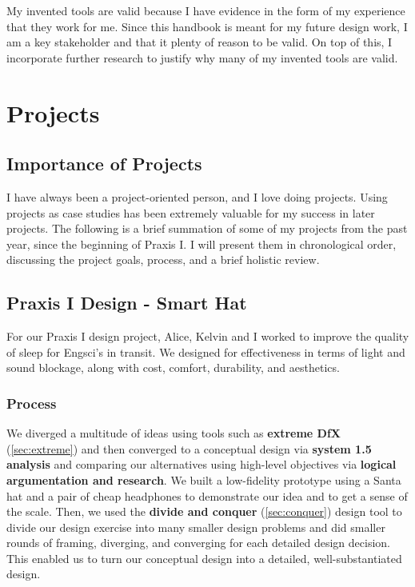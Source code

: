 \documentclass[a4paper,12pt]{article}
\begin{document}
My invented tools are valid because I have evidence in the form of my experience that they work for me. Since this handbook is meant for my future design work, I am a key stakeholder and that it plenty of reason to be valid. On top of this, I incorporate further research to justify why many of my invented tools are valid.




\section{Projects}
\subsection{Importance of Projects}
I have always been a project-oriented person, and I love doing projects. Using projects as case studies has been extremely valuable for my success in later projects. The following is a brief summation of some of my projects from the past year, since the beginning of Praxis I. I will present them in chronological order, discussing the project goals, process, and a brief holistic review.

\subsection{Praxis I Design - Smart Hat}
\label{sec:hat}
For our Praxis I design project, Alice, Kelvin and I worked to improve the quality of sleep for Engsci’s in transit. We designed for effectiveness in terms of light and sound blockage, along with cost, comfort, durability, and aesthetics.

\subsubsection{Process}
We diverged a multitude of ideas using tools such as \textbf{extreme DfX} (\ref{sec:extreme}) and then converged to a conceptual design via \textbf{system 1.5 analysis} and comparing our alternatives using high-level objectives via \textbf{logical argumentation and research}. We built a low-fidelity prototype using a Santa hat and a pair of cheap headphones to demonstrate our idea and to get a sense of the scale. Then, we used the \textbf{divide and conquer} (\ref{sec:conquer}) design tool to divide our design exercise into many smaller design problems and did smaller rounds of framing, diverging, and converging for each detailed design decision. This enabled us to turn our conceptual design into a detailed, well-substantiated design.
\end{document}
